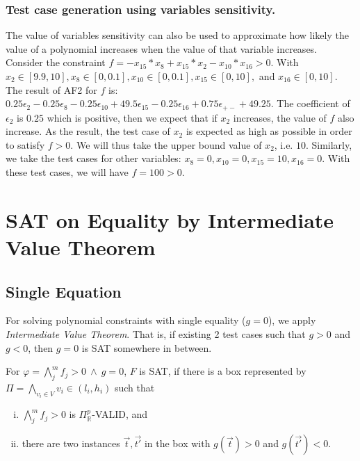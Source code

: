 \documentclass[runningheads,a4paper,oribibl]{llncs}
\newcommand{\suppress}[1]{} %
\begin{document}
\subsubsection*{Test case generation using variables sensitivity.}
\sloppy
The value of variables sensitivity can also be used to approximate how likely the value of a polynomial increases when the value of that variable increases. Consider the constraint $f = -x_{15}*x_8+x_{15}*x_2-x_{10}*x_{16}>0$. With ${x_2 \in [9.9, 10]}, {x_8 \in [0, 0.1]}, {x_{10} \in [0, 0.1]}, {x_{15} \in [0, 10]},$ and $ x_{16} \in [0, 10]$. The result of AF2 for $f$ is: $0.25 \epsilon_2 - 0.25 \epsilon_8 - 0.25 \epsilon_{10} + 49.5\epsilon_{15} - 0.25\epsilon_{16} + 0.75\epsilon_{+-} + 49.25$. The coefficient of $\epsilon_2$ is $0.25$ which is positive, then we expect that if $x_2$ increases, the value of $f$ also increase.  As the result, the test case of $x_2$ is expected as high as possible in order to satisfy $f>0$. We will thus take the upper bound value of $x_2$, i.e. $10$. Similarly, we take the test cases for other variables: $x_8=0, x_{10}=0, x_{15}=10, x_{16}=0$. With these test cases, we will have $f=100 > 0$.

\suppress{
I. Selecting API for testing:
  (1) Difficulty first by SAT-likelihood.   
  (2) Easy first by SAT-likelihood
  (10) Random.,
II. Selecting Variable:
  (8) With sensitivity
  (9) Without sensitivity - Random: 
III. Selecting box:
  (3) SAT-directed using IA-Testing.
  (4) UNSAT-directed using IA-Testing.
  (5) SAT-directed using SAT-likelihood
  (6) UNSAT-directed using SAT-likelihood
  (7) Random
}


\section{SAT on Equality by Intermediate Value Theorem} \label{sec:eq}
\subsection*{Single Equation}
For solving polynomial constraints with single equality ($g=0$), we apply {\em Intermediate Value Theorem}. 
That is, if existing 2 test cases such that $g > 0$ and $g < 0$, then $g=0$ is SAT somewhere in between. 

\begin{lemma} \label{lemma:ivt}
For $\varphi = \bigwedge \limits_{j}^m f_j > 0~\wedge~g = 0$, $F$ is SAT, if 
there is a box represented by $\Pi = \bigwedge\limits_{v_i \in V}v_i \in (l_i, h_i)$ such that
\begin{enumerate}[(i)]
\item $\bigwedge \limits_{j}^m f_j > 0$ is $\Pi^p_\mathbb{R}$-VALID, and 
\item there are two instances $\vec{t},\vec{t'}$ in the box with $g(\vec{t}) > 0$ and $g(\vec{t'}) < 0$.
\end{enumerate}
\end{lemma}
\end{document}
